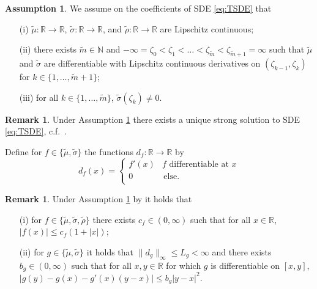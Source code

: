 \documentclass[11pt,a4paper]{article}
\makeatletter
\def\namedlabel#1#2{\begingroup
    #2%
    \def\@currentlabel{#2}%
    \phantomsection\label{#1}\endgroup
}
\numberwithin{equation}{section}
\theoremstyle{definition}
\newtheorem{assumption}{Assumption}[section]
\newtheorem{remark}[theorem]{Remark}
\newcommand{\N}{{\mathbb{N}}}
\newcommand{\R}{{\mathbb{R}}}
\makeatother
\begin{document}
\begin{assumption}\label{assZ} 
We assume on the coefficients of SDE \eqref{eq:TSDE} that
\begin{itemize}
\item[\namedlabel{Zi}{(i)}] $\widetilde\mu\colon\R \to \R$,  $\widetilde\sigma\colon\R\to\R$, and $\widetilde\rho\colon\R\to\R$ are Lipschitz continuous;
\item[\namedlabel{Zii}{(ii)}] there exists $\widetilde m\in\N$ and $-\infty = \zeta_0 < \zeta_1 < \ldots< \zeta_{\widetilde m}< \zeta_{\widetilde m+1} =\infty$ such that $\widetilde\mu$ and $\widetilde \sigma$ are differentiable with Lipschitz continuous derivatives on $(\zeta_{k-1},\zeta_{k})$ for $k\in\{1,\ldots,\widetilde m+1\}$;
\item[\namedlabel{Zv}{(iii)}] for all $k\in\{1,\dots,\widetilde m\}$, $\widetilde\sigma(\zeta_k) \neq 0$.
\end{itemize}
\end{assumption}

\begin{remark}
    Under Assumption \ref{assZ} there exists a unique strong solution to SDE \eqref{eq:TSDE}, c.f.~\cite[p.~255,~Theorem~6]{protter2005}.
\end{remark}

Define for $f\in\{\widetilde\mu,\widetilde\sigma\}$ the functions $d_f\colon\R\to\R$ by
\begin{equation}
d_f(x) = \left\{
\begin{array}{ll}
f'(x) & f \text{ differentiable at } x \\
0 & \, \textrm{else.} \\
\end{array}
\right. 
\end{equation}

\begin{remark}\label{ConAss}
    Under Assumption \ref{assZ} by \cite[Lemma 3.1]{PSS2024JMS} it holds that
    \begin{itemize}
        \item[(i)] for $f\in\{\widetilde\mu,\widetilde\sigma,\widetilde\rho\}$ there exists  $c_f \in (0,\infty)$ such that for all $x\in\R$, $|f(x)|\leq c_{f}(1+|x|)$;
        \item[(ii)] for $g\in\{\widetilde\mu,\widetilde\sigma\}$ it holds that $\|d_{g}\|_{\infty}\leq L_{g} <\infty$ and there exists $b_{g} \in(0,\infty)$ such that for all $x,y\in\R$ for which $g$ is differentiable on $[x,y]$, $|g(y)-g(x)-g'(x)(y-x)|\leq b_{g} |y-x|^2$.
    \end{itemize}
\end{remark}
\end{document}
